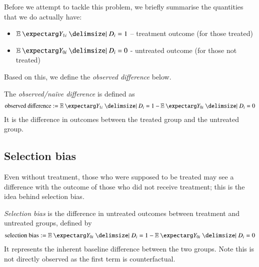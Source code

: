         Before we attempt to tackle this problem, we briefly summarise the quantities that we do actually have:
        \begin{itemize}
            \item $\expect{Y_{1i}|D_i = 1}$ – treatment outcome (for those treated)
            \item $\expect{Y_{0i}|D_i = 0}$ - untreated outcome (for those not treated)
        \end{itemize}
        Based on this, we define the \textit{observed difference} below.
        \begin{definition}
            The \textit{observed/naïve difference} is defined as
            \begin{align}
                \text{observed difference} := \expect{Y_{1i}|D_i = 1} - \expect{Y_{0i}|D_i = 0}
            \end{align}
            It is the difference in outcomes between the treated group and the untreated group.
        \end{definition}


        \subsection{Selection bias}
            Even without treatment, those who were supposed to be treated may see a difference with the outcome of those who did not receive treatment; this is the idea behind selection bias.

            \begin{definition}
                \textit{Selection bias} is the difference in untreated outcomes between treatment and untreated groups, defined by
                \begin{align}
                    \text{selection bias} := \expect{Y_{0i}|D_i = 1} - \expect{Y_{0i}|D_i = 0}
                \end{align}
                It represents the inherent baseline difference between the two groups. Note this is not directly observed as the first term is counterfactual.
            \end{definition}

